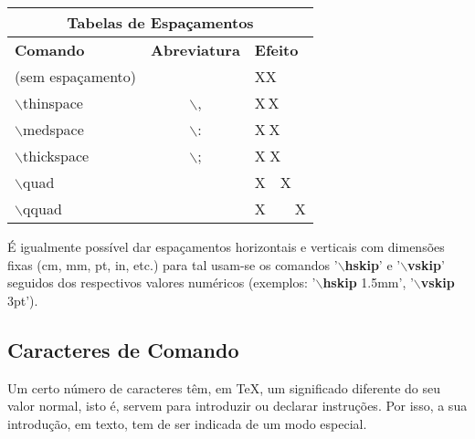 \documentclass[a4paper,12pt]{article}
\begin{document}
\begin{center}
\begin{tabular}{l|c|l} 
\multicolumn{3}{c}{\bf Tabelas de Espaçamentos}            \\ \hline
{\bf Comando}           & {\bf Abreviatura} & {\bf Efeito} \\ \hline
(sem espaçamento)       &                   & XX           \\ \hline
$\backslash$thinspace   & $\backslash$,     & X$\,$X       \\ \hline
$\backslash$medspace    & $\backslash$:     & X$\:$X       \\ \hline
$\backslash$thickspace  & $\backslash$;     & X$\;$X       \\ \hline
$\backslash$quad        &                   & X$\quad$X    \\ \hline
$\backslash$qquad       &                   & X$\qquad$X   \\ \hline
\end{tabular}
\end{center}

É igualmente possível dar espaçamentos horizontais e verticais
com dimensões fixas (cm, mm, pt, in, etc.) para tal usam-se
os comandos '$\backslash${\bf hskip}' e '$\backslash${\bf vskip}' 
seguidos dos respectivos valores numéricos 
(exemplos: '$\backslash${\bf hskip} 1.5mm',
'$\backslash${\bf vskip} 3pt').

\subsection{Caracteres de Comando}

Um certo número de caracteres têm, em \TeX, um significado diferente
do seu valor normal, isto é, servem para introduzir ou declarar 
instruções. Por isso, a sua introdução, em texto, tem de ser 
indicada de um modo especial.
\end{document}
